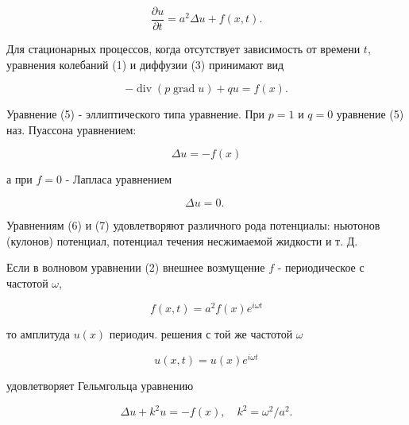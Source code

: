 \documentclass[10pt]{article}
\begin{document}
\[

\frac{\partial u}{\partial t}=a^{2} \Delta u+f(x, t) .

\]



Для стационарных процессов, когда отсутствует зависимость от времени $t$, уравнения колебаний (1) и диффузии (3) принимают вид



\[

-\operatorname{div}(p \operatorname{grad} u)+q u=f(x) .

\]



Уравнение (5) - эллиптического типа уравнение. При $p=1$ и $q=0$ уравнение (5) наз. Пуассона уравнением:



\[

\Delta u=-f(x)

\]



а при $f=0$ - Лапласа уравнением



\[

\Delta u=0 \text {. }

\]



Уравнениям (6) и (7) удовлетворяют различного рода потенциалы: ньютонов (кулонов) потенциал, потенциал течения несжимаемой жидкости и т. Д.



Если в волновом уравнении (2) внешнее возмущение $f$ - периодическое с частотой $\omega$,



\[

f(x, t)=a^{2} f(x) e^{i \omega t}

\]



то амплитуда $u(x)$ периодич. решения с той же частотой $\omega$



\[

u(x, t)=u(x) e^{i \omega t}

\]



удовлетворяет Гельмгольца уравнению



\[

\Delta u+k^{2} u=-f(x), \quad k^{2}=\omega^{2} / a^{2} .

\]
\end{document}
